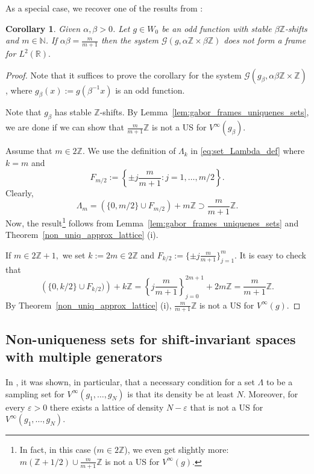 \documentclass[10pt,a4paper]{amsart}
\numberwithin{equation}{section}
\newtheorem{corollary}[theorem]{Corollary} \newcommand{\La}{\Lambda}
\newcommand{\R}{{\mathbb R}} \newcommand{\Q}{{\mathbb Q}} \newcommand{\Z}{{\mathbb Z}} \newcommand{\N}{{\mathbb N}}
\begin{document}
As a special case, we recover one of the results from \cite{MR3027914}:
 \begin{corollary}\label{cor:lyub_nes}
 Given $\alpha, \beta > 0$. Let $g \in W_0$ be an odd function with stable $\beta\Z$-shifts and $m\in\N$.
 If $\alpha\beta=\frac{m}{m+1}$ then the system $\mathcal{G}(g, \alpha \Z \times \beta \Z)$  does not form a frame for $L^2(\R).$
 \end{corollary}
 \begin{proof}
     Note that it suffices to prove the corollary for the system $\mathcal{G}(g_{\beta}, \alpha \beta \Z \times \Z)$, where $g_{\beta}(x):=g(\beta^{-1}x)$ is an odd function. 

     Note that $g_{\beta}$ has stable $\Z$-shifts.
     By Lemma~\ref{lem:gabor_frames_uniquenes_sets}, we are done if we can show that $ \frac{m}{m+1}\Z$ is not a US for $V^{\infty}(g_{\beta})$.
     
     Assume that $m\in 2\Z$. We use the definition of $\Lambda_k$ in \eqref{eq:set_Lambda_def} where $k=m$ and $$F_{m/2}:=\left\{\pm j\frac{m}{m+1}: j=1,\dots,m/2\right\}.$$ Clearly, $$\Lambda_m=(\{0,m/2\}\cup F_{m/2})+m\Z \supset \frac{m}{m+1}\Z.$$ Now, the result\footnote{In fact, in this case ($m\in 2\Z$), we even get slightly more: $m(\Z+1/2) \cup \frac{m}{m+1}\Z$ is not a US for $V^\infty(g).$} follows from Lemma~\ref{lem:gabor_frames_uniquenes_sets} and  Theorem~\ref{non_uniq_approx_lattice} (i).

If $m\in 2\Z+1,$ we set $k:=2m\in 2\Z$ and  $F_{k/2}:=\{\pm j\frac{m}{m+1}\}_{j=1}^m.$ It is easy to check that $$\left(\{0, k/2\} \cup F_{k/2} )\right) +k\Z = \left\{j\frac{m}{m+1}\right\}_{j=0}^{2m+1}+2m\Z=\frac{m}{m+1}\Z.$$By Theorem~\ref{non_uniq_approx_lattice} (i),  $\frac{m}{m+1}\Z$ is not a US for $V^\infty(g).$
\end{proof}

 

\subsection{ Non-uniqueness sets for shift-invariant spaces with multiple generators}

In \cite[Theorem 5]{MR1756138}, it was shown, in particular, that a necessary condition for a set $\Lambda$ to be a sampling set for $V^{\infty}(g_1,\dots,g_N)$ is that its density be at least $N$. 
Moreover, for every $\varepsilon>0$ there exists a lattice of density $N-\varepsilon$ that is not a US for $V^\infty(g_1,\dots,g_N)$. 
\end{document}

